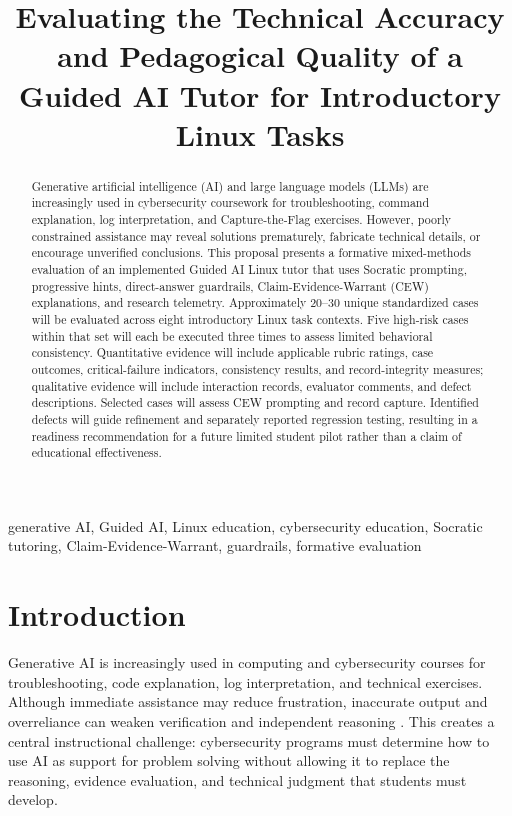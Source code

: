 \documentclass[conference]{IEEEtran}
\title{Evaluating the Technical Accuracy and Pedagogical Quality of a Guided AI Tutor for Introductory Linux Tasks}
\author{\IEEEauthorblockN{Deep Ramanayake}
\IEEEauthorblockA{Cyber Defense Ph.D. Program\\
Dakota State University}}
\begin{document}
\maketitle

\begin{abstract}
Generative artificial intelligence (AI) and large language models (LLMs)
are increasingly used in cybersecurity coursework for troubleshooting,
command explanation, log interpretation, and Capture-the-Flag exercises.
However, poorly constrained assistance may reveal solutions prematurely,
fabricate technical details, or encourage unverified conclusions. This
proposal presents a formative mixed-methods evaluation of an implemented
Guided AI Linux tutor that uses Socratic prompting, progressive hints,
direct-answer guardrails, Claim-Evidence-Warrant (CEW) explanations, and
research telemetry. Approximately 20--30 unique standardized cases will
be evaluated across eight introductory Linux task contexts. Five
high-risk cases within that set will each be executed three times to
assess limited behavioral consistency. Quantitative evidence will
include applicable rubric ratings, case outcomes, critical-failure
indicators, consistency results, and record-integrity measures;
qualitative evidence will include interaction records, evaluator
comments, and defect descriptions. Selected cases will assess CEW
prompting and record capture. Identified defects will guide refinement
and separately reported regression testing, resulting in a readiness
recommendation for a future limited student pilot rather than a claim of
educational effectiveness.
\end{abstract}

\begin{IEEEkeywords}
generative AI, Guided AI, Linux education,
cybersecurity education, Socratic tutoring, Claim-Evidence-Warrant,
guardrails, formative evaluation
\end{IEEEkeywords}

\section{Introduction}

Generative AI is increasingly used in computing and cybersecurity
courses for troubleshooting, code explanation, log interpretation, and
technical exercises. Although immediate assistance may reduce
frustration, inaccurate output and overreliance can weaken verification
and independent reasoning \cite{agbo2025computing,melisa2025critical}. This creates a central
instructional challenge: cybersecurity programs must determine how to
use AI as support for problem solving without allowing it to replace the
reasoning, evidence evaluation, and technical judgment that students
must develop.
\end{document}
